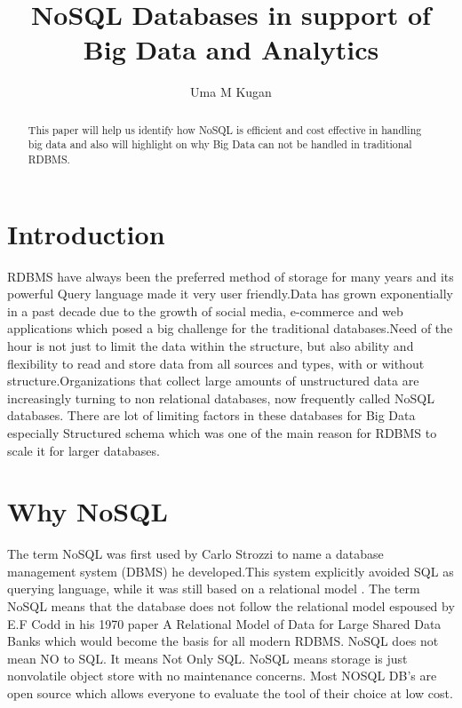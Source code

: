 \documentclass[sigconf]{acmart}
\begin{document}
\title{NoSQL Databases in support of Big Data and Analytics}


\author{Uma M Kugan}

\renewcommand{\shortauthors}{Uma}


\begin{abstract}
This paper will help us identify how NoSQL is efficient and cost effective in handling big data and also will highlight on why Big Data can not be handled in traditional RDBMS.
\end{abstract}



\maketitle

\section{Introduction}

RDBMS have always been the preferred method of storage for many years and its powerful Query language made it very user friendly.Data has grown exponentially in a past decade due to the growth of social media, e-commerce and web applications which posed a big challenge for the traditional databases.Need of the hour is not just to limit the data within the structure, but also ability and flexibility to read and store data from all sources and types, with or without structure.Organizations that collect large amounts of unstructured data are increasingly turning to non relational databases, now frequently called NoSQL databases. \cite{neal} There are lot of limiting factors in these databases for Big Data especially Structured schema which was one of the main reason for RDBMS to scale it for larger databases. \cite{aspirenosql}

\section{Why NoSQL}
The term NoSQL was first used by Carlo Strozzi to name a database management system (DBMS) he developed.This system explicitly avoided SQL as querying language, while it was still based on a relational model \cite{seasupenn}. The term NoSQL means that the database does not follow the relational model espoused by E.F Codd in his 1970 paper A Relational Model of Data for Large Shared Data Banks \cite{rdbms} which would become the basis for all modern RDBMS.  NoSQL does not mean NO to SQL. It means Not Only SQL. NoSQL means storage is just nonvolatile object store with no maintenance concerns. Most NOSQL DB's are open source which allows everyone to evaluate the tool of their choice at low cost.
\end{document}

